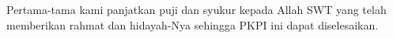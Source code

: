 \begin{acknowledgements}
Pertama-tama kami panjatkan puji dan syukur kepada Allah SWT yang telah memberikan rahmat dan hidayah-Nya sehingga PKPI ini dapat diselesaikan.
\end{acknowledgements}